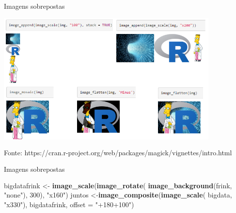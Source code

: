 \documentclass[
  ignorenonframetext,
]{beamer}
\newenvironment{Shaded}{\begin{snugshade}}{\end{snugshade}}
\newcommand{\DataTypeTok}[1]{\textcolor[rgb]{0.13,0.29,0.53}{#1}}
\newcommand{\DecValTok}[1]{\textcolor[rgb]{0.00,0.00,0.81}{#1}}
\newcommand{\KeywordTok}[1]{\textcolor[rgb]{0.13,0.29,0.53}{\textbf{#1}}}
\newcommand{\NormalTok}[1]{#1}
\newcommand{\StringTok}[1]{\textcolor[rgb]{0.31,0.60,0.02}{#1}}
\begin{document}
\begin{frame}{Imagens sobrepostas}
\protect\hypertarget{imagens-sobrepostas-1}{}

\small

\includegraphics[width=4.4in]{IMAGENS/juntar_sobrepor}

\begin{center}
\tiny{Fonte: https://cran.r-project.org/web/packages/magick/vignettes/intro.html}
\end{center}

\end{frame}

\begin{frame}[fragile]{Imagens sobrepostas}
\protect\hypertarget{imagens-sobrepostas-2}{}

\begin{Shaded}
\begin{Highlighting}[]
\NormalTok{bigdatafrink <-}\StringTok{ }\KeywordTok{image_scale}\NormalTok{(}\KeywordTok{image_rotate}\NormalTok{(}
  \KeywordTok{image_background}\NormalTok{(frink, }\StringTok{"none"}\NormalTok{), }\DecValTok{300}\NormalTok{), }\StringTok{"x160"}\NormalTok{)}
\NormalTok{juntos <-}\KeywordTok{image_composite}\NormalTok{(}\KeywordTok{image_scale}\NormalTok{(}
\NormalTok{  bigdata, }\StringTok{"x330"}\NormalTok{), bigdatafrink, }\DataTypeTok{offset =} \StringTok{"+180+100"}\NormalTok{)}
\end{Highlighting}
\end{Shaded}

\end{frame}
\end{document}
